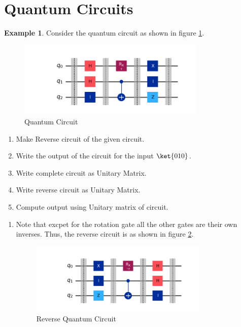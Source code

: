 \documentclass[12pt, oneside]{book}
\theoremstyle{definition}
\theoremstyle{definition}
\newtheorem{example}{Example}[section]
\theoremstyle{remark}
\begin{document}
\section{Quantum Circuits}
\begin{example}
    Consider the quantum circuit as shown in figure \ref{fig:qcircuit1}.
    \begin{figure}[H]
        \centering
        \includegraphics[width=0.8\textwidth]{../images/qcircuit1.png}
        \caption{Quantum Circuit}
        \label{fig:qcircuit1}
    \end{figure}
    \begin{enumerate}
        \item Make Reverse circuit of the given circuit.
        \item Write the output of the circuit for the input $\ket{010}$.
        \item Write complete circuit as Unitary Matrix.
        \item Write reverse circuit as Unitary Matrix.
        \item Compute output using Unitary matrix of circuit.
    \end{enumerate}
    \begin{enumerate}
        \item Note that excpet for the rotation gate all the other gates are their own inverses. Thus, the reverse circuit is as shown in figure \ref{fig:qcircuit1-rev}.
        \begin{figure}[H]
            \centering
            \includegraphics[width=0.8\textwidth]{../images/qcircuit1-rev.png}
            \caption{Reverse Quantum Circuit}
            \label{fig:qcircuit1-rev}

\end{figure}
\end{enumerate}
\end{example}
\end{document}
